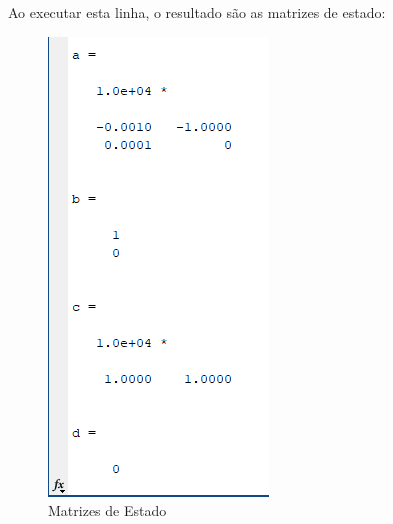 \documentclass[a4paper, 12pt]{article}
\begin{document}
	Ao executar esta linha, o resultado são as matrizes de estado:
	\begin{figure}[h]
		\centering
		\includegraphics[scale=0.8]{imagens/a13.png}
		\caption{Matrizes de Estado}
	\end{figure}
	
	
	
	
\newpage	
\end{document}
